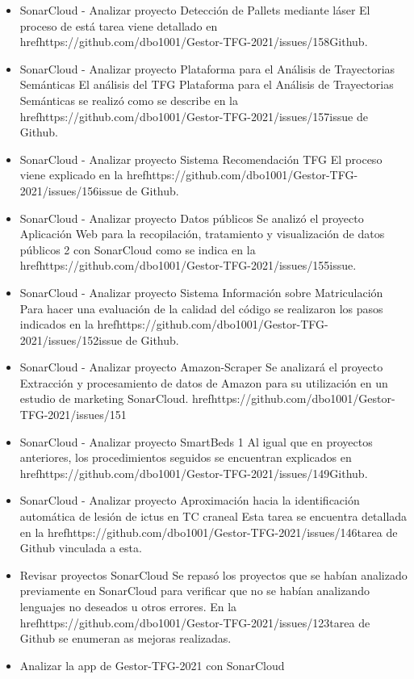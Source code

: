 \begin{itemize}
	\item SonarCloud - Analizar proyecto Detección de Pallets mediante láser
		El proceso de está tarea viene detallado en href{https://github.com/dbo1001/Gestor-TFG-2021/issues/158}{Github}.
	\item SonarCloud - Analizar proyecto Plataforma para el Análisis de Trayectorias Semánticas
		El análisis del TFG Plataforma para el Análisis de Trayectorias Semánticas se realizó como se describe en la href{https://github.com/dbo1001/Gestor-TFG-2021/issues/157}{issue de Github}.
	\item SonarCloud - Analizar proyecto Sistema Recomendación TFG
		El proceso viene explicado en la href{https://github.com/dbo1001/Gestor-TFG-2021/issues/156}{issue} de Github.
	\item SonarCloud - Analizar proyecto Datos públicos
		Se analizó el proyecto Aplicación Web para la recopilación, tratamiento y visualización de datos públicos 2 con SonarCloud como se indica en la href{https://github.com/dbo1001/Gestor-TFG-2021/issues/155}{issue}.
	\item SonarCloud - Analizar proyecto Sistema Información sobre Matriculación
		Para hacer una evaluación de la calidad del código se realizaron los pasos indicados en la href{https://github.com/dbo1001/Gestor-TFG-2021/issues/152}{issue} de Github.
	\item SonarCloud - Analizar proyecto Amazon-Scraper
		Se analizará el proyecto Extracción y procesamiento de datos de Amazon para su utilización en un estudio de marketing SonarCloud. href{https://github.com/dbo1001/Gestor-TFG-2021/issues/151}{}
	\item SonarCloud - Analizar proyecto SmartBeds 1
		Al igual que en proyectos anteriores, los procedimientos seguidos se encuentran explicados en href{https://github.com/dbo1001/Gestor-TFG-2021/issues/149}{Github}.
	\item SonarCloud - Analizar proyecto Aproximación hacia la identificación automática de lesión de ictus en TC craneal
		Esta tarea se encuentra detallada en la href{https://github.com/dbo1001/Gestor-TFG-2021/issues/146}{tarea} de Github vinculada a esta.
	\item Revisar proyectos SonarCloud
		Se repasó los proyectos que se habían analizado previamente en SonarCloud para verificar que no se habían analizando lenguajes no deseados u otros errores. En la href{https://github.com/dbo1001/Gestor-TFG-2021/issues/123}{tarea} de Github se enumeran as mejoras realizadas.
	\item Analizar la app de Gestor-TFG-2021 con SonarCloud

\end{itemize}
